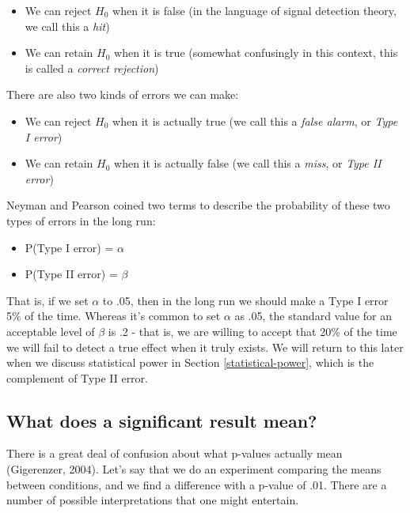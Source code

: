 \documentclass[
  12pt,
]{book}
\providecommand{\tightlist}{%
  \setlength{\itemsep}{0pt}\setlength{\parskip}{0pt}}
\begin{document}
\begin{itemize}
\tightlist
\item
  We can reject \(H_0\) when it is false (in the language of signal detection theory, we call this a \emph{hit})
\item
  We can retain \(H_0\) when it is true (somewhat confusingly in this context, this is called a \emph{correct rejection})
\end{itemize}

There are also two kinds of errors we can make:

\begin{itemize}
\tightlist
\item
  We can reject \(H_0\) when it is actually true (we call this a \emph{false alarm}, or \emph{Type I error})
\item
  We can retain \(H_0\) when it is actually false (we call this a \emph{miss}, or \emph{Type II error})
\end{itemize}

Neyman and Pearson coined two terms to describe the probability of these two types of errors in the long run:

\begin{itemize}
\tightlist
\item
  P(Type I error) = \(\alpha\)
\item
  P(Type II error) = \(\beta\)
\end{itemize}

That is, if we set \(\alpha\) to .05, then in the long run we should make a Type I error 5\% of the time. Whereas it's common to set \(\alpha\) as .05, the standard value for an acceptable level of \(\beta\) is .2 - that is, we are willing to accept that 20\% of the time we will fail to detect a true effect when it truly exists. We will return to this later when we discuss statistical power in Section \ref{statistical-power}, which is the complement of Type II error.

\hypertarget{what-does-a-significant-result-mean}{%
\subsection{What does a significant result mean?}\label{what-does-a-significant-result-mean}}

There is a great deal of confusion about what p-values actually mean (Gigerenzer, 2004). Let's say that we do an experiment comparing the means between conditions, and we find a difference with a p-value of .01. There are a number of possible interpretations that one might entertain.
\end{document}
